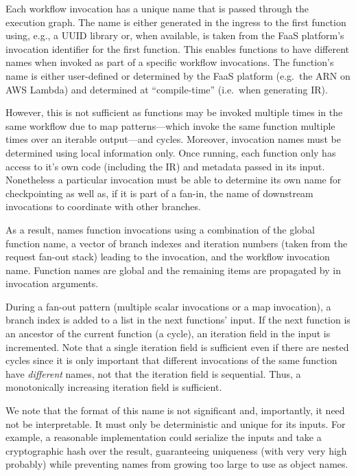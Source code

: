 Each workflow invocation has a unique name that is passed through the
execution graph. The name is either generated in the ingress to the first
function using, e.g., a UUID library or, when available, is taken from the
FaaS platform's invocation identifier for the first function. This enables
functions to have different names when invoked as part of a specific workflow
invocations. The function's name is either user-defined or determined by the
FaaS platform (e.g.\ the ARN on AWS Lambda) and determined at ``compile-time''
(i.e.\ when generating \name{} IR).

However, this is not sufficient as functions may be invoked multiple times in
the same workflow due to map patterns---which invoke the same function
multiple times over an iterable output---and cycles. Moreover, invocation
names must be determined using local information only. Once running, each
function only has access to it's own code (including the IR) and metadata
passed in its input. Nonetheless a particular invocation must be able to
determine its own name for checkpointing as well as, if it is part of a
fan-in, the name of downstream invocations to coordinate with other branches.

As a result, \name{} names function invocations using a combination of the
global function name, a vector of branch indexes and iteration numbers (taken
from the \name{} request fan-out stack) leading to the invocation, and the
workflow invocation name. Function names are global and the remaining items
are propagated by \name{} in invocation arguments.

During a fan-out pattern (multiple scalar invocations or a map invocation), a
branch index is added to a list in the next functions' input. If the next
function is an ancestor of the current function (a cycle), an iteration field
in the input is incremented. Note that a single iteration field is sufficient
even if there are nested cycles since it is only important that different
invocations of the same function have \emph{different} names, not that the
iteration field is sequential. Thus, a monotonically increasing iteration
field is sufficient.

We note that the format of this name is not significant and, importantly, it
need not be interpretable. It must only be deterministic and unique for its
inputs. For example, a reasonable implementation could serialize the inputs
and take a cryptographic hash over the result, guaranteeing uniqueness (with
very very high probably) while preventing names from growing too large to use
as object names.
